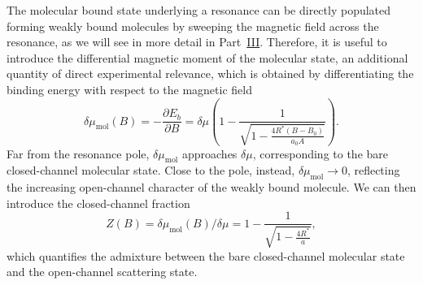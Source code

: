 The molecular bound state underlying a resonance can be directly populated forming weakly bound molecules by sweeping the magnetic field across the resonance, as we will see in more detail in Part~\hyperref[pt:MakingProbing]{III}. Therefore, it is useful to introduce	the differential magnetic moment of the molecular state, an additional quantity of direct experimental relevance, which is obtained by differentiating the binding energy with respect to the magnetic field
\begin{equation}\label{eq:MagneticMoment_Intro}
	\delta\mu_{\mathrm{mol}}(B)=-\frac{\partial E_b}{\partial B}=\delta\mu\left(1-\frac{1}{\sqrt{1-\frac{4R^*(B-B_0)}{a_0 A}}}\right).
\end{equation}
Far from the resonance pole, $\delta\mu_{\mathrm{mol}}$ approaches $\delta\mu$, corresponding to the bare closed-channel molecular state. Close to the pole, instead, $\delta\mu_{\mathrm{mol}}\to0$, reflecting the increasing open-channel character of the weakly bound molecule. We can then introduce the closed-channel fraction
\begin{equation}\label{eq:ClosedChannelFraction_Intro}
	Z(B)=\delta\mu_{\mathrm{mol}}(B)/ \delta\mu=1-\frac{1}{\sqrt{1-\frac{4R^*}{a}}},
\end{equation}
which quantifies the admixture between the bare closed-channel molecular state and the open-channel scattering state.

